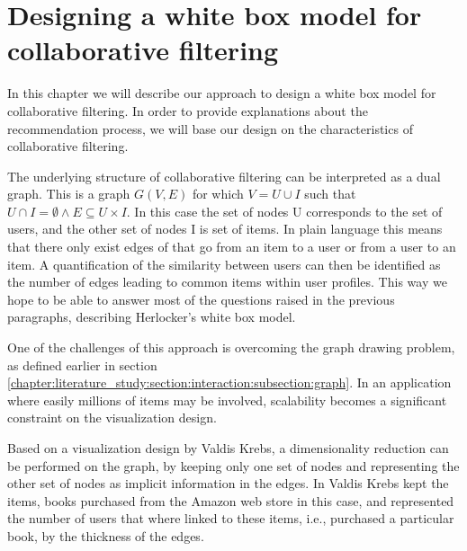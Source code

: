 \chapter{Designing a white box model for collaborative filtering}\label{chapter:whitebox}

In this chapter we will describe our approach to design a white box model for collaborative filtering. In order to provide explanations about the recommendation process, we will base our design on the characteristics of collaborative filtering.

The underlying structure of collaborative filtering can be interpreted as a dual graph. This is a graph $G(V,E)$ for which $V = U \cup I$ such that $U \cap I = \emptyset \wedge E \subseteq U \times I$\cite{dekimpe:2007}. In this case the set of nodes U corresponds to the set of users, and the other set of nodes I is set of items. In plain language this means that there only exist edges of that go from an item to a user or from a user to an item. A quantification of the similarity between users can then be identified as the number of edges leading to common items within user profiles. This way we hope to be able to answer most of the questions raised in the previous paragraphs, describing Herlocker's white box model.

One of the challenges of this approach is overcoming the graph drawing problem, as defined earlier in section \ref{chapter:literature_study:section:interaction:subsection:graph}. In an application where easily millions of items may be involved, scalability becomes a significant constraint on the visualization design\cite{herman:2000}.


Based on a visualization design by Valdis Krebs, a dimensionality reduction can be performed on the graph, by keeping only one set of nodes and representing the other set of nodes as implicit information in the edges. In \cite{steele:2010} Valdis Krebs kept the items, books purchased from the Amazon web store in this case, and represented the number of users that where linked to these items, i.e., purchased a particular book, by the thickness of the edges.
